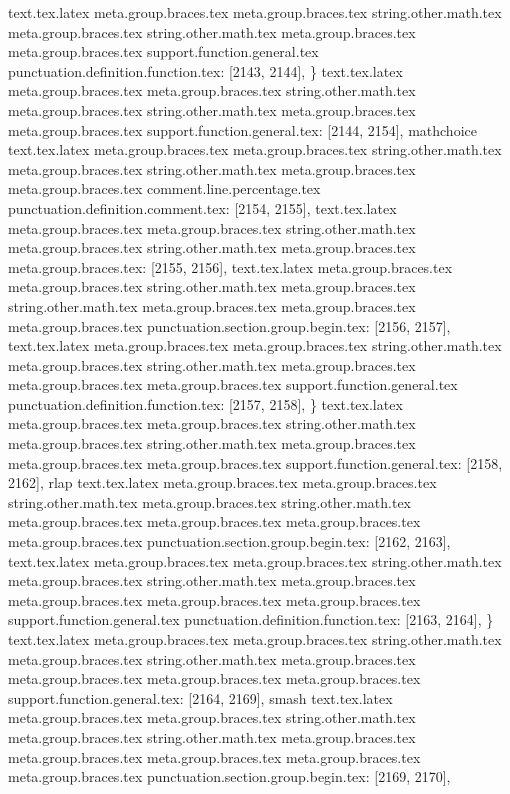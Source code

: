 {{{{{{{{{{{{{{{{{{{{{{{{{{{{{{{{{{{{{{{{{{{{{{{{{{{{{{{{text.tex.latex meta.group.braces.tex meta.group.braces.tex string.other.math.tex meta.group.braces.tex string.other.math.tex meta.group.braces.tex meta.group.braces.tex support.function.general.tex punctuation.definition.function.tex: [2143, 2144], {\}
text.tex.latex meta.group.braces.tex meta.group.braces.tex string.other.math.tex meta.group.braces.tex string.other.math.tex meta.group.braces.tex meta.group.braces.tex support.function.general.tex: [2144, 2154], {mathchoice}
text.tex.latex meta.group.braces.tex meta.group.braces.tex string.other.math.tex meta.group.braces.tex string.other.math.tex meta.group.braces.tex meta.group.braces.tex comment.line.percentage.tex punctuation.definition.comment.tex: [2154, 2155], {%
text.tex.latex meta.group.braces.tex meta.group.braces.tex string.other.math.tex meta.group.braces.tex string.other.math.tex meta.group.braces.tex meta.group.braces.tex: [2155, 2156], {
}
text.tex.latex meta.group.braces.tex meta.group.braces.tex string.other.math.tex meta.group.braces.tex string.other.math.tex meta.group.braces.tex meta.group.braces.tex meta.group.braces.tex punctuation.section.group.begin.tex: [2156, 2157], {{}
text.tex.latex meta.group.braces.tex meta.group.braces.tex string.other.math.tex meta.group.braces.tex string.other.math.tex meta.group.braces.tex meta.group.braces.tex meta.group.braces.tex support.function.general.tex punctuation.definition.function.tex: [2157, 2158], {\}
text.tex.latex meta.group.braces.tex meta.group.braces.tex string.other.math.tex meta.group.braces.tex string.other.math.tex meta.group.braces.tex meta.group.braces.tex meta.group.braces.tex support.function.general.tex: [2158, 2162], {rlap}
text.tex.latex meta.group.braces.tex meta.group.braces.tex string.other.math.tex meta.group.braces.tex string.other.math.tex meta.group.braces.tex meta.group.braces.tex meta.group.braces.tex meta.group.braces.tex punctuation.section.group.begin.tex: [2162, 2163], {{}
text.tex.latex meta.group.braces.tex meta.group.braces.tex string.other.math.tex meta.group.braces.tex string.other.math.tex meta.group.braces.tex meta.group.braces.tex meta.group.braces.tex meta.group.braces.tex support.function.general.tex punctuation.definition.function.tex: [2163, 2164], {\}
text.tex.latex meta.group.braces.tex meta.group.braces.tex string.other.math.tex meta.group.braces.tex string.other.math.tex meta.group.braces.tex meta.group.braces.tex meta.group.braces.tex meta.group.braces.tex support.function.general.tex: [2164, 2169], {smash}
text.tex.latex meta.group.braces.tex meta.group.braces.tex string.other.math.tex meta.group.braces.tex string.other.math.tex meta.group.braces.tex meta.group.braces.tex meta.group.braces.tex meta.group.braces.tex meta.group.braces.tex punctuation.section.group.begin.tex: [2169, 2170], {{}
}}}}}}}}}}}}}}}}}}}}}}}}}}}}}}}}}}}}}}}}}}}}}}}}}}}}}}}}}}}}}}}

